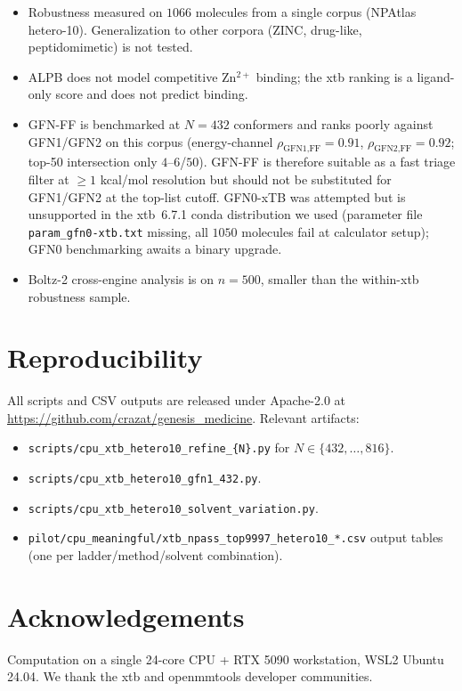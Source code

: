 \documentclass[11pt,a4paper]{article}
\begin{document}
\begin{itemize}[leftmargin=*]
  \item Robustness measured on $1066$ molecules from a single corpus
    (NPAtlas hetero-10). Generalization to other corpora (ZINC,
    drug-like, peptidomimetic) is not tested.
  \item ALPB does not model competitive Zn$^{2+}$ binding; the xtb
    ranking is a ligand-only score and does not predict binding.
  \item GFN-FF is benchmarked at $N = 432$ conformers and ranks
    poorly against GFN1/GFN2 on this corpus (energy-channel
    $\rho_{\text{GFN1,FF}} = 0.91$, $\rho_{\text{GFN2,FF}} = 0.92$;
    top-50 intersection only $4$--$6$/$50$). GFN-FF is therefore
    suitable as a fast triage filter at $\geq 1$ kcal/mol resolution
    but should not be substituted for GFN1/GFN2 at the top-list cutoff.
    GFN0-xTB was attempted but is unsupported in the xtb~6.7.1 conda
    distribution we used (parameter file \texttt{param\_gfn0-xtb.txt}
    missing, all $1050$ molecules fail at calculator setup); GFN0
    benchmarking awaits a binary upgrade.
  \item Boltz-2 cross-engine analysis is on $n = 500$, smaller than
    the within-xtb robustness sample.
\end{itemize}

\section{Reproducibility}
\label{sec:reproducibility}

All scripts and CSV outputs are released under Apache-2.0 at
\url{https://github.com/crazat/genesis_medicine}. Relevant artifacts:

\begin{itemize}[leftmargin=*]
  \item \texttt{scripts/cpu\_xtb\_hetero10\_refine\_\{N\}.py} for
    $N \in \{432,\dots,816\}$.
  \item \texttt{scripts/cpu\_xtb\_hetero10\_gfn1\_432.py}.
  \item \texttt{scripts/cpu\_xtb\_hetero10\_solvent\_variation.py}.
  \item \texttt{pilot/cpu\_meaningful/xtb\_npass\_top9997\_hetero10\_*.csv}
    output tables (one per ladder/method/solvent combination).
\end{itemize}

\section*{Acknowledgements}

Computation on a single 24-core CPU + RTX 5090 workstation, WSL2
Ubuntu 24.04. We thank the xtb and openmmtools developer communities.



\end{document}
